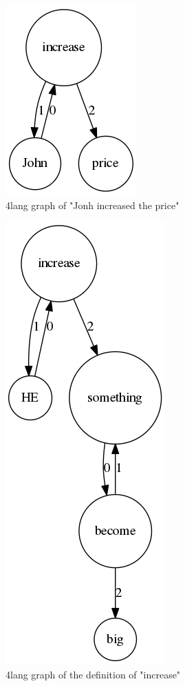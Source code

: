 \begin{figure}
	\centering
	\includegraphics[scale=0.5]{figures/thirdrule1}
	\caption{4lang graph of "Jonh increased the price"}
	\label{fig:thirdrule}
\end{figure}

\begin{figure}
	\centering
	\includegraphics[scale=0.5]{figures/thirdrule2}
	\caption{4lang graph of the definition of "increase"}
	\label{fig:thirdrule2}
\end{figure}

